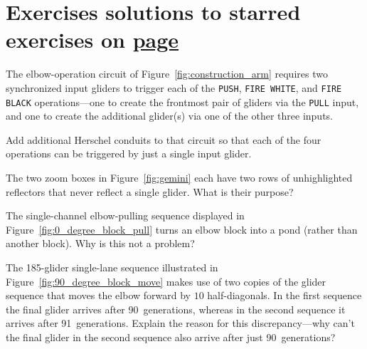 \section*{Exercises \hfill \normalfont\textsf{\small solutions to starred exercises on \hyperlink{solutions_universal_construction}{page \pageref{solutions_universal_construction}}}}
\label{sec:universal_construction_exercises}
\vspace*{-0.4cm}\hrulefill\vspace*{-0.3cm}\footnotesize\begin{multicols}{2}\vspace*{-0.4cm}\raggedcolumns{}
	\setlength{\parskip}{0pt}
	
	
	\begin{problem}\label{exer:construction_arm_lanes_timed}
		The elbow-operation circuit of Figure~\ref{fig:construction_arm} requires two synchronized input gliders to trigger each of the \texttt{PUSH}, \texttt{FIRE WHITE}, and \texttt{FIRE BLACK} operations---one to create the frontmost pair of gliders via the \texttt{PULL} input, and one to create the additional glider(s) via one of the other three inputs.
		
		Add additional Herschel conduits to that circuit so that each of the four operations can be triggered by just a single input glider.
	\end{problem}
	
	
	\mfilbreak
	
	
	\begin{problemstar}\label{exer:gemini_unhighlighted_reflectors}
		The two zoom boxes in Figure~\ref{fig:gemini} each have two rows of unhighlighted reflectors that never reflect a single glider. What is their purpose?
	\end{problemstar}
	
	
	\mfilbreak
	
	
	\begin{problem}\label{exer:block_pull_pond}
		The single-channel elbow-pulling sequence displayed in Figure~\ref{fig:0_degree_block_pull} turns an elbow block into a pond (rather than another block). Why is this not a problem?
	\end{problem}
	
	
	\mfilbreak
	
	
	\begin{problemstar}\label{exer:single_lane_glider_final_glider_explain}
		The 185-glider single-lane sequence illustrated in Figure~\ref{fig:90_degree_block_move} makes use of two copies of the glider sequence that moves the elbow forward by $10$ half-diagonals. In the first sequence the final glider arrives after 90~generations, whereas in the second sequence it arrives after 91~generations. Explain the reason for this discrepancy---why can't the final glider in the second sequence also arrive after just 90~generations?
	\end{problemstar}
	

\end{multicols}
